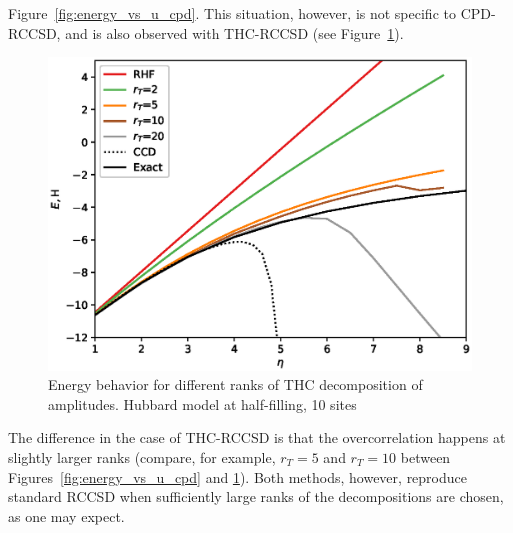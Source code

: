 Figure~\ref{fig:energy_vs_u_cpd}. This situation, however, is not 
specific to CPD-RCCSD, and is also observed with THC-RCCSD (see 
Figure~\ref{fig:energy_vs_u_thc}).
%
\begin{figure}[ht!]
\centering
\includegraphics[width=\columnwidth]
{figures/tcc_strong_correlation/energy_vs_u_10_sites_thc_rccsd}
\caption{Energy behavior for different ranks of THC decomposition of 
amplitudes. Hubbard model at half-filling, 10 sites}
\label{fig:energy_vs_u_thc}
\end{figure}
%
The difference in the case of THC-RCCSD is that the overcorrelation happens at 
slightly larger ranks (compare, for example, $r_{T} = 5$ and $r_{T} = 10$ 
between Figures~\ref{fig:energy_vs_u_cpd} and \ref{fig:energy_vs_u_thc}). Both 
methods, however, reproduce standard RCCSD when sufficiently large ranks of the 
decompositions are chosen, as one may expect.

